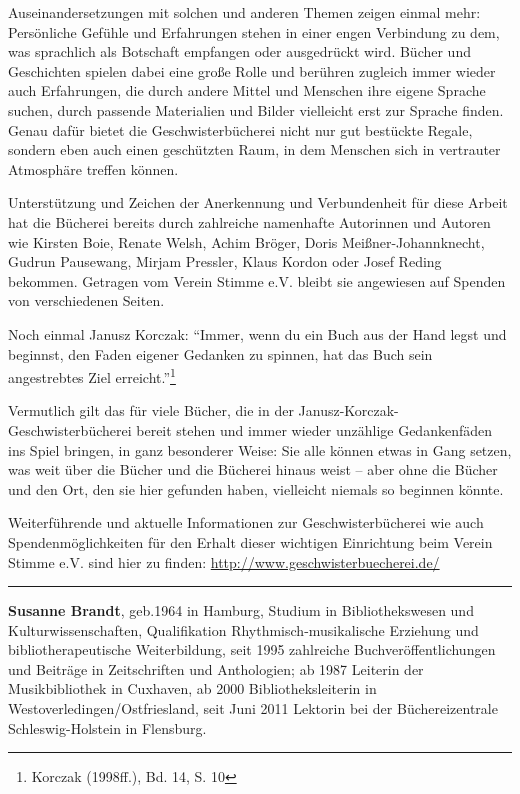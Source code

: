 \documentclass[a4paper,
fontsize=11pt,
oneside,
numbers=noperiodatend,
parskip=half-,
bibliography=totoc,
final
]{scrartcl}
\begin{document}
Auseinandersetzungen mit solchen und anderen Themen zeigen einmal mehr:
Persönliche Gefühle und Erfahrungen stehen in einer engen Verbindung zu
dem, was sprachlich als Botschaft empfangen oder ausgedrückt wird.
Bücher und Geschichten spielen dabei eine große Rolle und berühren
zugleich immer wieder auch Erfahrungen, die durch andere Mittel und
Menschen ihre eigene Sprache suchen, durch passende Materialien und
Bilder vielleicht erst zur Sprache finden. Genau dafür bietet die
Geschwisterbücherei nicht nur gut bestückte Regale, sondern eben auch
einen geschützten Raum, in dem Menschen sich in vertrauter Atmosphäre
treffen können.

Unterstützung und Zeichen der Anerkennung und Verbundenheit für diese
Arbeit hat die Bücherei bereits durch zahlreiche namenhafte Autorinnen
und Autoren wie Kirsten Boie, Renate Welsh, Achim Bröger, Doris
Meißner-Johannknecht, Gudrun Pausewang, Mirjam Pressler, Klaus Kordon
oder Josef Reding bekommen. Getragen vom Verein Stimme e.V. bleibt sie
angewiesen auf Spenden von verschiedenen Seiten.

Noch einmal Janusz Korczak: \enquote{Immer, wenn du ein Buch aus der
Hand legst und beginnst, den Faden eigener Gedanken zu spinnen, hat das
Buch sein angestrebtes Ziel erreicht.}\footnote{Korczak (1998ff.), Bd.
  14, S. 10}

Vermutlich gilt das für viele Bücher, die in der
Janusz-Korczak-Geschwisterbücherei bereit stehen und immer wieder
unzählige Gedankenfäden ins Spiel bringen, in ganz besonderer Weise: Sie
alle können etwas in Gang setzen, was weit über die Bücher und die
Bücherei hinaus weist -- aber ohne die Bücher und den Ort, den sie hier
gefunden haben, vielleicht niemals so beginnen könnte.

Weiterführende und aktuelle Informationen zur Geschwisterbücherei wie
auch Spendenmöglichkeiten für den Erhalt dieser wichtigen Einrichtung
beim Verein Stimme e.V. sind hier zu finden:
\url{http://www.geschwisterbuecherei.de/}

\begin{center}\rule{0.5\linewidth}{\linethickness}\end{center}

\textbf{Susanne Brandt}, geb.1964 in Hamburg, Studium in
Bibliothekswesen und Kulturwissenschaften, Qualifikation
Rhythmisch-musikalische Erziehung und bibliotherapeutische
Weiterbildung, seit 1995 zahlreiche Buchveröffentlichungen und Beiträge
in Zeitschriften und Anthologien; ab 1987 Leiterin der Musikbibliothek
in Cuxhaven, ab 2000 Bibliotheksleiterin in
Westoverledingen/Ostfriesland, seit Juni 2011 Lektorin bei der
Büchereizentrale Schleswig-Holstein in Flensburg.
\end{document}
